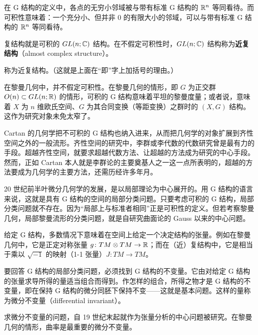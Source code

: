 在 G 结构的定义中，各点的无穷小邻域被与带有标准 G 结构的 $\mathbb{R}^n$ 等同看待。而可积性意味着：一个充分小、但并非 0 的有限大小的邻域，可以与带有标准 G 结构的 $\mathbb{R}^n$ 等同看待。


复结构就是可积的 $GL(n;\mathbb{C})$ 结构。在不假定可积性时，$GL(n;\mathbb{C})$ 结构称为\textbf{近复结构}（almost complex structure）。

称为近复结构。（这就是上面在“即”字上加括号的理由。）

在黎曼几何中，并不假定可积性。在黎曼几何的情形，即 $G$ 为正交群 $O(n)\subset GL(n;\mathbb{R})$ 的情形，可积的 G 结构意味着平坦的黎曼度量；或者说，意味着 $X$ 为 $n$ 维欧氏空间、$G$ 为其合同变换（等距变换）之群时的 $(X,G)$ 结构。这作为研究对象未免太窄了。

Cartan 的几何学把不可积的 G 结构也纳入进来，从而把几何学的对象扩展到齐性空间之外的一般流形。齐性空间的研究中，李群或李代数的代数研究曾是最有力的手段。超越齐性空间，就要求超越代数方法、让超越的方法成为研究的中心手段。然而，正如 Cartan 本人就是李群论的主要奠基人之一这一点所表明的，超越的方法要成为几何学的主要方法，还需历经许多年月。

20 世纪前半叶微分几何学的发展，是以局部理论为中心展开的。用 G 结构的语言来说，这就是具有 G 结构的空间的局部分类问题。只要考虑可积的 G 结构，局部分类问题就不存在。因为“局部上与标准者相同”正是可积性的定义。但若考察黎曼几何，局部黎曼流形的分类问题，就是自研究曲面论的 Gauss 以来的中心问题。

给定 G 结构，多数情况下意味着在空间上给定一个决定结构的张量。例如在黎曼几何中，它是正定对称张量 $g\colon TM\otimes TM\to\mathbb{R}$；而在（近）复结构中，它是相当于乘以 $\sqrt{-1}$ 的映射（1-1 张量）$J\colon TM\to TM$。

要回答 G 结构的局部分类问题，必须找到 G 结构的不变量。它由对给定 G 结构的张量求导所得的量适当组合而得到。作怎样的组合，所得之物才是 G 结构的不变量，即在保持 G 结构的微分同胚下保持不变——这就是基本问题。这样的量称为微分不变量（differential invariant）。

求微分不变量的问题，自 19 世纪末起就作为张量分析的中心问题被研究。在黎曼几何的情形，曲率是最重要的微分不变量。

